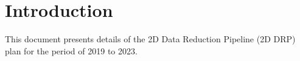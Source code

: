 \section{Introduction}

This document presents details of the 2D Data Reduction Pipeline (2D DRP) plan for the period of
2019 to 2023.



